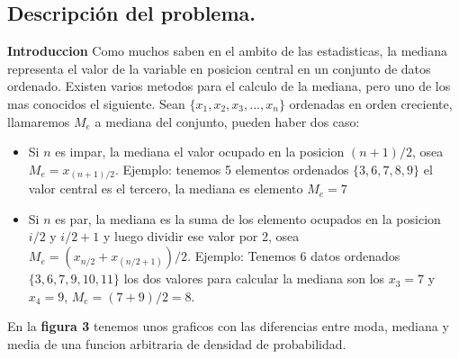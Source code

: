 \subsection{Descripción del problema.}

\vspace*{0.3cm}
\textbf{Introduccion} \newline
Como muchos saben en el ambito de las estadisticas, la mediana representa el valor de la variable en posicion central en un conjunto de datos ordenado.
Existen varios metodos para el calculo de la mediana, pero uno de los mas conocidos el siguiente.
Sean $\{x_1,x_2,x_3,...,x_n\}$ ordenadas en orden creciente, llamaremos $M_e$ a mediana del conjunto, pueden haber dos caso:

\begin{itemize}
    \item Si $n$ es impar, la mediana el valor ocupado en la posicion $(n+1)/2$, osea $M_e = x_{(n+1)/2}$.
    Ejemplo: tenemos 5 elementos ordenados $\{ 3,6,7,8,9 \}$ el valor central es el tercero, la mediana es elemento $M_e = 7$
    \item Si $n$ es par, la mediana es la suma de los elemento ocupados en la posicion $i/2$ y $i/2+1$ y luego dividir ese valor por 2, osea $ M_e = (x_{n/2} + x_{(n/2+1)})/2$.
    Ejemplo: Tenemos 6 datos ordenados $\{ 3,6,7,9,10,11 \}$ los dos valores para calcular la mediana son los $x_3=7$ y $x_4=9$, $ M_e = (7+9)/2 = 8$. 
\end{itemize}
En la \textbf{figura 3} tenemos unos graficos con las diferencias entre moda, mediana y media de una funcion arbitraria de densidad de probabilidad.	  
